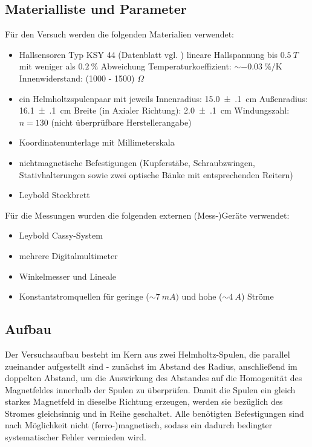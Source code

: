 \documentclass[12pt,a4paper]{article}
\begin{document}
\subsection{Materialliste und Parameter}
Für den Versuch werden die folgenden Materialien verwendet:
\begin{itemize}
	\item Hallsensoren Typ KSY 44 (Datenblatt vgl. \cite{hall})
		\subitem lineare Hallspannung bis $\SI{0.5}{T}$ mit weniger als $0.2\ \%$ Abweichung
		\subitem Temperaturkoeffizient: $\sim -0.03\ \%/\text{K}$
		\subitem Innenwiderstand: (1000 - 1500) $\Omega$
	\item ein Helmholtzspulenpaar mit jeweils
		\subitem Innenradius: \SI{15.0(1)}{\centi m}
		\subitem Außenradius: \SI{16.1(1)}{\centi m}
		\subitem Breite (in Axialer Richtung): \SI{2.0(1)}{\centi m}
		\subitem Windungszahl: $n=130$ (nicht überprüfbare Herstellerangabe)
	\item Koordinatenunterlage mit Millimeterskala
	\item nichtmagnetische Befestigungen (Kupferstäbe, Schraubzwingen, Stativhalterungen sowie zwei optische Bänke mit entsprechenden Reitern)
	\item Leybold Steckbrett
\end{itemize}
Für die Messungen wurden die folgenden externen (Mess-)Geräte verwendet:
\begin{itemize}
	\item Leybold Cassy-System
	\item mehrere Digitalmultimeter
	\item Winkelmesser und Lineale
	\item Konstantstromquellen für geringe ($\sim \SI{7}{mA})$ und hohe ($\sim \SI{4}{A}$) Ströme
\end{itemize}
\subsection{Aufbau}
Der Versuchsaufbau besteht im Kern aus zwei Helmholtz-Spulen, die parallel zueinander aufgestellt sind - zunächst im Abstand des Radius, anschließend im doppelten Abstand, um die Auswirkung des Abstandes auf die Homogenität des Magnetfeldes innerhalb der Spulen zu überprüfen. Damit die Spulen ein gleich starkes Magnetfeld in dieselbe Richtung erzeugen, werden sie bezüglich des Stromes gleichsinnig und in Reihe geschaltet. Alle benötigten Befestigungen sind nach Möglichkeit nicht (ferro-)magnetisch, sodass ein dadurch bedingter systematischer Fehler vermieden wird.\\
\end{document}
